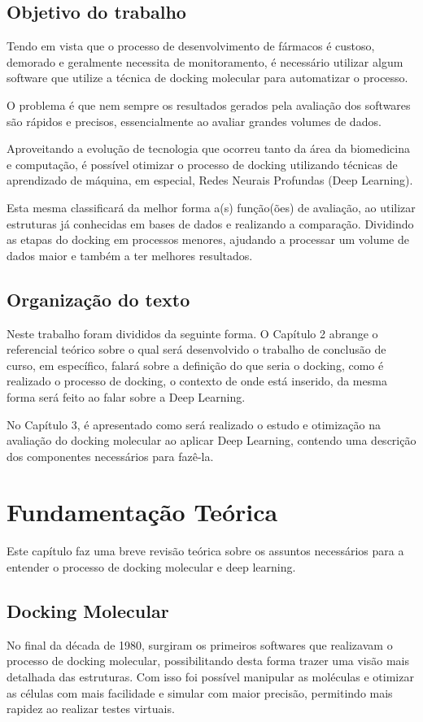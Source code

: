\documentclass[tcc, capa]{texucpel}
\begin{document}
\section{Objetivo do trabalho}
Tendo em vista que o processo de desenvolvimento de fármacos é custoso, demorado e geralmente necessita de monitoramento, é necessário utilizar algum software que utilize a técnica de docking molecular para automatizar o processo.

O problema é que nem sempre os resultados gerados pela avaliação dos softwares são rápidos e precisos, essencialmente ao avaliar grandes volumes de dados.

Aproveitando a evolução de tecnologia que ocorreu tanto da área da biomedicina e computação, é possível otimizar o processo de docking utilizando técnicas de aprendizado de máquina, em especial, Redes Neurais Profundas (Deep Learning).

Esta mesma classificará da melhor forma a(s) função(ões) de avaliação, ao utilizar estruturas já conhecidas em bases de dados e realizando a comparação.
Dividindo as etapas do docking em processos menores, ajudando a processar um volume de dados maior e também a ter melhores resultados.


\section{Organização do texto}
Neste trabalho foram divididos da seguinte forma.
O Capítulo 2 abrange o referencial teórico sobre o qual será desenvolvido o trabalho de conclusão de curso, em específico, falará sobre a definição do que seria o docking, como é realizado o processo de docking, o contexto de onde está inserido, da mesma forma será feito ao falar sobre a Deep Learning.

No Capítulo 3, é apresentado como será realizado o estudo e otimização na avaliação do docking molecular ao aplicar Deep Learning, contendo uma descrição dos componentes necessários para fazê-la.

\chapter{Fundamentação Teórica}
Este capítulo faz uma breve revisão teórica sobre os assuntos necessários para a entender o processo de docking molecular  e deep learning.

\section{Docking Molecular}
No final da década de 1980, surgiram os primeiros softwares que realizavam o processo de docking molecular, possibilitando desta forma trazer uma visão mais detalhada das estruturas. Com isso foi possível manipular as moléculas e otimizar as células com mais facilidade e simular com maior precisão, permitindo mais rapidez ao realizar testes virtuais.
\end{document}
